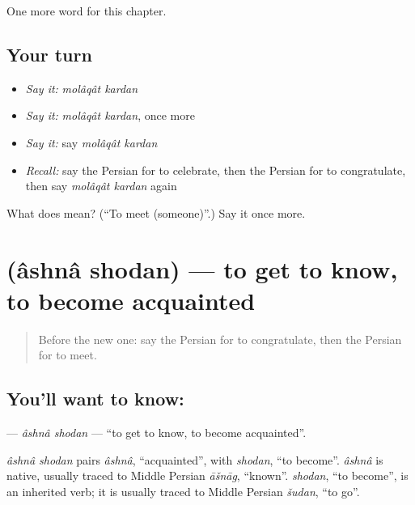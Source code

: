 \begin{grammarlens}[title={What you've built}]
One more word for this chapter.
\end{grammarlens}

\subsection*{Your turn}
\begin{itemize}
\raggedright
  \item \emph{Say it:} \emph{molâqât kardan}
  \item \emph{Say it:} \emph{molâqât kardan}, once more
  \item \emph{Say it:} say \emph{molâqât kardan}
  \item \emph{Recall:} say the Persian for to celebrate, then the Persian for to congratulate, then say \emph{molâqât kardan} again
\end{itemize}

\begin{tcolorbox}[breakable,colback=teal!4,colframe=teal!35!black,title={Before you move on}]
What does   mean? (\textquotedblleft{}To meet (someone)\textquotedblright{}.) Say it once more.
\end{tcolorbox}
\section[\texorpdfstring{\fa{آشنا} \fa{شدن} (âshnâ shodan)}{آشنا شدن (âshnâ shodan)}]{  (âshnâ shodan) — to get to know, to become acquainted}

\label{lesson:FA-C183-ashna-shodan}



\begin{quote}
Before the new one: say the Persian for to congratulate, then the Persian for to meet.
\end{quote}

\subsection*{You'll want to know:  }
\textbf{ } — \emph{âshnâ shodan} — \textquotedblleft{}to get to know, to become acquainted\textquotedblright{}.

\begin{cousinweb}
\emph{âshnâ shodan} pairs \emph{âshnâ}, \textquotedblleft{}acquainted\textquotedblright{}, with \emph{shodan}, \textquotedblleft{}to become\textquotedblright{}. \emph{âshnâ} is native, usually traced to Middle Persian \emph{āšnāg}, \textquotedblleft{}known\textquotedblright{}. \emph{shodan}, \textquotedblleft{}to become\textquotedblright{}, is an inherited verb; it is usually traced to Middle Persian \emph{šudan}, \textquotedblleft{}to go\textquotedblright{}.
\end{cousinweb}

